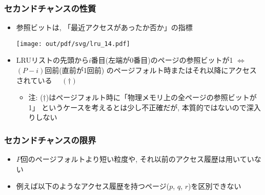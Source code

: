 \documentclass[12pt,dvipdfmx]{beamer}
\begin{document}
\begin{frame}
  \frametitle{セカンドチャンスの性質}
  \begin{itemize}
  \item 参照ビットは,
    「最近アクセスがあったか否か」の指標

    \texttt{[image: out/pdf/svg/lru\_14.pdf]}

  \item LRUリストの先頭から$i$番目(左端が0番目)のページの参照ビットが1
    $\iff$ $(P-i)$回前(直前が1回前)
    のページフォルト時またはそれ以降にアクセスされている $\quad (\dagger)$
    \begin{itemize}
    \item 注: ($\dagger$)はページフォルト時に「物理メモリ上の全ページの参照ビットが1」
      というケースを考えるとは少し不正確だが, 本質的ではないので深入りしない
    \end{itemize}
  \end{itemize}
\end{frame}

\begin{frame}
  \frametitle{セカンドチャンスの限界}
  \begin{itemize}
  \item $P$回のページフォルトより短い粒度や, それ以前のアクセス履歴は用いていない
  \item 例えば以下のようなアクセス履歴を持つページ($p$, $q$, $r$)を区別できない

    \begin{center}
    \def\svgwidth{\textwidth}
    {\tiny}
    \end{center}
  \end{itemize}
\end{frame}
\end{document}
